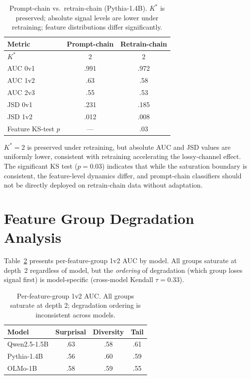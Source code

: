 \documentclass[11pt,a4paper]{article}
\begin{document}
\begin{table}[h]
\centering
\small
\begin{tabular}{lcc}
\toprule
\textbf{Metric} & \textbf{Prompt-chain} & \textbf{Retrain-chain} \\
\midrule
$K^*$ & 2 & 2 \\
AUC 0v1 & .991 & .972 \\
AUC 1v2 & .63 & .58 \\
AUC 2v3 & .55 & .53 \\
JSD 0v1 & .231 & .185 \\
JSD 1v2 & .012 & .008 \\
Feature KS-test $p$ & --- & .03 \\
\bottomrule
\end{tabular}
\caption{Prompt-chain vs.\ retrain-chain (Pythia-1.4B). $K^*$ is preserved; absolute signal levels are lower under retraining; feature distributions differ significantly.}
\label{tab:retrain}
\end{table}

$K^*=2$ is preserved under retraining, but absolute AUC and JSD values are uniformly lower, consistent with retraining accelerating the lossy-channel effect.
The significant KS test ($p=0.03$) indicates that while the saturation boundary is consistent, the feature-level dynamics differ, and prompt-chain classifiers should not be directly deployed on retrain-chain data without adaptation.

\section{Feature Group Degradation Analysis}
\label{app:features}

Table~\ref{tab:feat_group} presents per-feature-group 1v2 AUC by model.
All groups saturate at depth~2 regardless of model, but the \emph{ordering} of degradation (which group loses signal first) is model-specific (cross-model Kendall $\tau = 0.33$).

\begin{table}[h]
\centering
\small
\begin{tabular}{lccc}
\toprule
\textbf{Model} & \textbf{Surprisal} & \textbf{Diversity} & \textbf{Tail} \\
\midrule
Qwen2.5-1.5B & .63 & .58 & .61 \\
Pythia-1.4B & .56 & .60 & .59 \\
OLMo-1B & .58 & .59 & .55 \\
\bottomrule
\end{tabular}
\caption{Per-feature-group 1v2 AUC. All groups saturate at depth 2; degradation ordering is inconsistent across models.}
\label{tab:feat_group}
\end{table}
\end{document}

